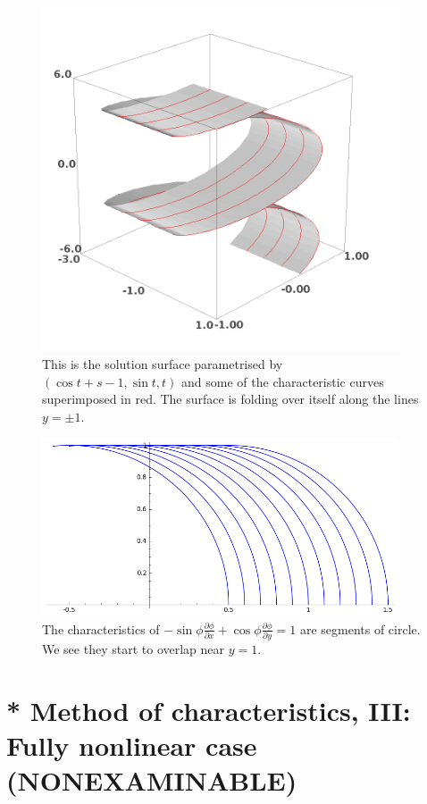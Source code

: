 \begin{figure}[htb]
\begin{center}
\includegraphics[width=300pt]{qcharacteristics4.png}
\end{center}
\caption{This is the solution surface parametrised by $(\cos t+s-1,\sin t,t)$ and some of the characteristic curves superimposed in red. The surface is folding over itself along the lines $y=\pm 1$.}
\label{fig-characteristics4}
\end{figure}

\begin{figure}[htb]
\begin{center}
\includegraphics[width=300pt]{qcharacteristics3.png}
\end{center}
\caption{The characteristics of $-\sin\phi\frac{\partial\phi}{\partial x}+\cos\phi\frac{\partial\phi}{\partial y}=1$ are segments of circle. We see they start to overlap near $y=1$.}
\label{fig-characteristics3}
\end{figure}

\chapter[Method of characteristics, III]{* Method of characteristics, III: Fully nonlinear case (NONEXAMINABLE)}

